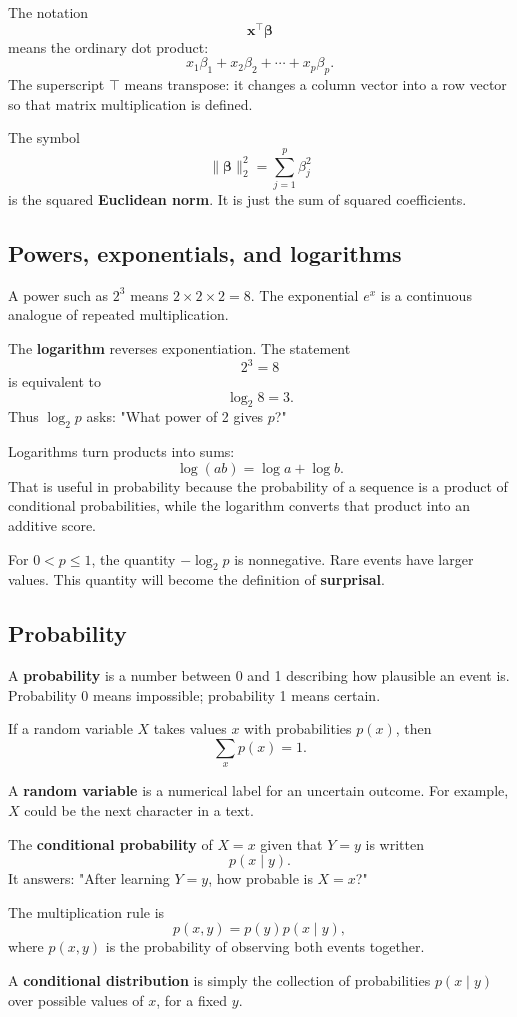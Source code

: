 \documentclass[11pt]{article}
\begin{document}
The notation
\[
\mathbf x^\top\boldsymbol\beta
\]
means the ordinary dot product:
\[
x_1\beta_1+x_2\beta_2+\cdots+x_p\beta_p.
\]
The superscript $\top$ means transpose: it changes a column vector into a row vector so that matrix multiplication is defined.

The symbol
\[
\|\boldsymbol\beta\|_2^2
=\sum_{j=1}^p\beta_j^2
\]
is the squared \textbf{Euclidean norm}. It is just the sum of squared coefficients.

\subsection{Powers, exponentials, and logarithms}
A power such as $2^3$ means $2\times2\times2=8$. The exponential $e^x$ is a continuous analogue of repeated multiplication.

The \textbf{logarithm} reverses exponentiation. The statement
\[
2^3=8
\]
is equivalent to
\[
\log_2 8=3.
\]
Thus $\log_2 p$ asks: "What power of 2 gives $p$?"

Logarithms turn products into sums:
\[
\log(ab)=\log a+\log b.
\]
That is useful in probability because the probability of a sequence is a product of conditional probabilities, while the logarithm converts that product into an additive score.

For $0<p\le 1$, the quantity $-\log_2p$ is nonnegative. Rare events have larger values. This quantity will become the definition of \textbf{surprisal}.

\subsection{Probability}
A \textbf{probability} is a number between 0 and 1 describing how plausible an event is. Probability 0 means impossible; probability 1 means certain.

If a random variable $X$ takes values $x$ with probabilities $p(x)$, then
\[
\sum_xp(x)=1.
\]

A \textbf{random variable} is a numerical label for an uncertain outcome. For example, $X$ could be the next character in a text.

The \textbf{conditional probability} of $X=x$ given that $Y=y$ is written
\[
p(x\mid y).
\]
It answers: "After learning $Y=y$, how probable is $X=x$?"

The multiplication rule is
\[
p(x,y)=p(y)p(x\mid y),
\]
where $p(x,y)$ is the probability of observing both events together.

A \textbf{conditional distribution} is simply the collection of probabilities $p(x\mid y)$ over possible values of $x$, for a fixed $y$.
\end{document}
